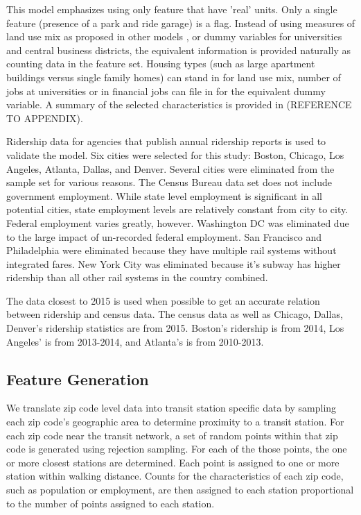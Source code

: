 \documentclass{article}
\begin{document}
This model emphasizes using only feature that have 'real' units. Only a single feature (presence of a park and ride garage) is a flag. Instead of using measures of land use mix as proposed in other models \cite{Durning2015, Gutierrez2011}, or dummy variables for universities and central business districts, the equivalent information is provided naturally as counting data in the feature set. Housing types (such as large apartment buildings versus single family homes) can stand in for land use mix, number of jobs at universities or in financial jobs can file in for the equivalent dummy variable. A summary of the selected characteristics is provided in (REFERENCE TO APPENDIX).

Ridership data for agencies that publish annual ridership reports is used to validate the model. Six cities were selected for this study: Boston, Chicago, Los Angeles, Atlanta, Dallas, and Denver. Several cities were eliminated from the sample set for various reasons. The Census Bureau data set does not include government employment. While state level employment is significant in all potential cities, state employment levels are relatively constant from city to city. Federal employment varies greatly, however. Washington DC was eliminated due to the large impact of un-recorded federal employment. San Francisco and Philadelphia were eliminated because they have multiple rail systems without integrated fares. New York City was eliminated because it's subway has higher ridership than all other rail systems in the country combined. 

The data closest to 2015 is used when possible to get an accurate relation between ridership and census data. The census data as well as Chicago, Dallas, Denver's ridership statistics are from 2015. Boston's ridership is from 2014, Los Angeles' is from 2013-2014, and Atlanta's is from 2010-2013. 



\subsection{Feature Generation}

We translate zip code level data into transit station specific data by sampling each zip code's geographic area to determine proximity to a transit station. For each zip code near the transit network, a set of random points within that zip code is generated using rejection sampling. For each of the those points, the one or more closest stations are determined. Each point is assigned to one or more station within walking distance. Counts for the characteristics of each zip code, such as population or employment, are then assigned to each station proportional to the number of points assigned to each station.
\end{document}
